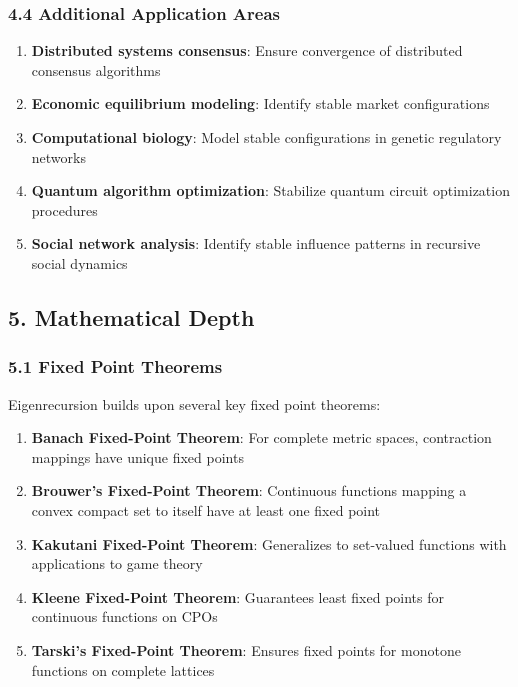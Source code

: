 \documentclass[
]{article}
\providecommand{\tightlist}{%
  \setlength{\itemsep}{0pt}\setlength{\parskip}{0pt}}
\begin{document}
\subsubsection{4.4 Additional Application
Areas}\label{additional-application-areas}

\begin{enumerate}
\def\labelenumi{\arabic{enumi}.}
\tightlist
\item
  \textbf{Distributed systems consensus}: Ensure convergence of
  distributed consensus algorithms
\item
  \textbf{Economic equilibrium modeling}: Identify stable market
  configurations
\item
  \textbf{Computational biology}: Model stable configurations in genetic
  regulatory networks
\item
  \textbf{Quantum algorithm optimization}: Stabilize quantum circuit
  optimization procedures
\item
  \textbf{Social network analysis}: Identify stable influence patterns
  in recursive social dynamics
\end{enumerate}

\subsection{5. Mathematical Depth}\label{mathematical-depth}

\subsubsection{5.1 Fixed Point Theorems}\label{fixed-point-theorems}

Eigenrecursion builds upon several key fixed point theorems:

\begin{enumerate}
\def\labelenumi{\arabic{enumi}.}
\tightlist
\item
  \textbf{Banach Fixed-Point Theorem}: For complete metric spaces,
  contraction mappings have unique fixed points
\item
  \textbf{Brouwer's Fixed-Point Theorem}: Continuous functions mapping a
  convex compact set to itself have at least one fixed point
\item
  \textbf{Kakutani Fixed-Point Theorem}: Generalizes to set-valued
  functions with applications to game theory
\item
  \textbf{Kleene Fixed-Point Theorem}: Guarantees least fixed points for
  continuous functions on CPOs
\item
  \textbf{Tarski's Fixed-Point Theorem}: Ensures fixed points for
  monotone functions on complete lattices
\end{enumerate}
\end{document}

